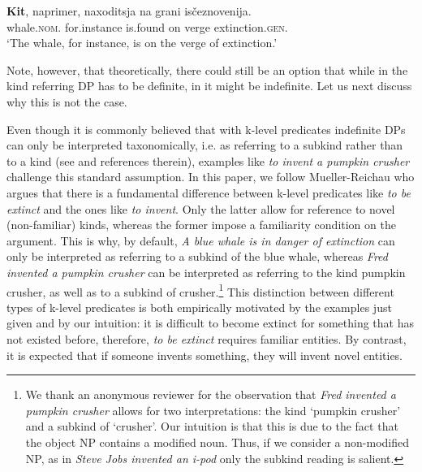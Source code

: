 \documentclass[output=paper
,modfonts
,nonflat]{langsci/langscibook}
\begin{document}
	\ea\label{ex:borik:11}
	\gll	\textbf{Kit}, 				naprimer, 		naxoditsja	 	na 	grani		is\v{c}eznovenija.\\
	whale.\textsc{nom.}	for.instance 	is.found 		on	verge		extinction.\textsc{gen.}\\
	\glt	`The whale, for instance, is on the verge of extinction.'
	\z
	
	Note, however, that theoretically, there could still be an option that while in  the kind referring DP has to be definite, in  it might be indefinite. Let us next discuss why this is not the case.
	
	Even though it is commonly believed that with k-level predicates indefinite DPs can only be interpreted taxonomically, i.e. as referring to a subkind rather than to a kind (see \citealt{Mueller-Reichau2011} and references therein),  examples like \textit{to invent a pumpkin crusher} challenge this standard assumption. In this paper, we follow Mueller-Reichau who argues that there is a fundamental difference between k-level predicates like \textit{to be extinct} and the ones like \textit{to invent}. Only the latter allow for reference to novel (non-familiar) kinds, whereas the former impose a familiarity condition on the argument. This is why, by default, \textit{A blue whale is in danger of extinction} can only be interpreted as referring to a subkind of the blue whale, whereas \textit{Fred invented a pumpkin crusher} can be interpreted as referring to the kind pumpkin crusher, as well as to a subkind of crusher.\footnote{We thank an anonymous reviewer for the observation that \textit{Fred invented a pumpkin crusher} allows for two interpretations: the kind `pumpkin crusher' and a subkind of `crusher'. Our intuition is that this is due to the fact that the object NP contains a modified noun. Thus, if we consider a non-modified NP, as in \textit{Steve Jobs invented an i-pod} only the subkind reading is salient.} This distinction between different types of k-level predicates is both empirically motivated by the examples just given and by our intuition: it is difficult to become extinct for something that has not existed before, therefore, \textit{to be extinct} requires familiar entities. By contrast, it is expected that if someone invents something, they will invent novel entities. 
	
\end{document}
